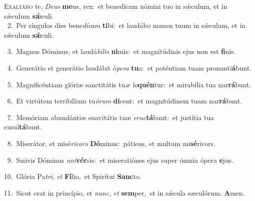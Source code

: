 \lettrine{\initial\textcolor{\initialcolor}{E}}{xaltábo} te, \textit{De}\-\textit{us} \textbf{me}\-us, rex:~\star et benedícam nómini tuo in sǽculum, et in sǽculum \textbf{sǽ}\-culi.\\
{\numbfont\textcolor{\numbcolor}{~2.}}~Per síngulos dies bene\-\textit{dí}\-\textit{cam} \textbf{ti}\-bi:~\star et laudábo nomen tuum in sǽculum, et in sǽculum \textbf{sǽ}\-culi.\par
{\numbfont\textcolor{\numbcolor}{~3.}}~Magnus Dóminus, et laudá\-\textit{bi}\-\textit{lis} \textbf{ni}\-mis:~\star et magnitúdinis ejus non est \textbf{fi}\-nis.\par
{\numbfont\textcolor{\numbcolor}{~4.}}~Generátio et generátio laudábit ó\-\textit{pe}\-\textit{ra} \textbf{tu}\-a:~\star et poténtiam tuam pronunti\-\textbf{á}\-bunt.\par
{\numbfont\textcolor{\numbcolor}{~5.}}~Magnificéntiam glóriæ sanctitátis tu\textit{æ} \textit{lo}\-\textbf{quén}tur:~\star et mirabília tua nar\-\textbf{rá}\-bunt.\par
{\numbfont\textcolor{\numbcolor}{~6.}}~Et virtútem terribílium tu\-\textit{ó}\-\textit{rum} \textbf{di}\-cent:~\star et magnitúdinem tuam nar\-\textbf{rá}\-bunt.\par
{\numbfont\textcolor{\numbcolor}{~7.}}~Memóriam abundántiæ suavitátis tuæ \textit{e}\-\textit{ruc}\textbf{tá}bunt:~\star et justítia tua exsul\-\textbf{tá}\-bunt.\par
{\numbfont\textcolor{\numbcolor}{~8.}}~Miserátor, et misé\-\textit{ri}\-\textit{cors} \textbf{Dó}\-minus:~\star pátiens, et multum mi\-\textbf{sé}\-ricors.\par
{\numbfont\textcolor{\numbcolor}{~9.}}~Suávis Dóminus \textit{u}\-\textit{ni}\textbf{vér}sis:~\star et miseratiónes ejus super ómnia ópera \textbf{e}\-jus.\par
{\numbfont\textcolor{\numbcolor}{10.}}~Glória Pa\-\textit{tri}\-, \textit{et} \textbf{Fí}\-lio,~\star et Spirítui \textbf{Sanc}\-to.\par
{\numbfont\textcolor{\numbcolor}{11.}}~Sicut erat in princípio, et \textit{nunc}\-, \textit{et} \textbf{sem}\-per,~\star et in sǽcula sæculórum. \textbf{A}\-men.\par
